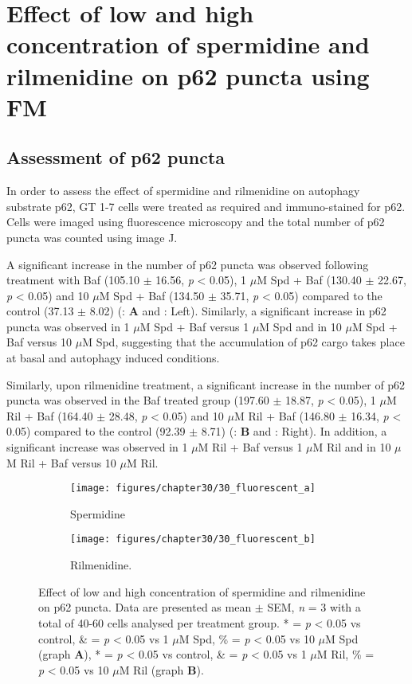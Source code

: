 {\section{Effect of low and high concentration of spermidine and rilmenidine on p62 puncta using FM}
\subsection{Assessment of p62 puncta}

In order to assess the effect of spermidine and rilmenidine on autophagy substrate p62, GT 1-7 cells were treated as required and immuno-stained for p62. Cells were imaged using fluorescence microscopy and the total number of p62 puncta was counted using image J. 

A significant increase in the number of p62 puncta was observed following treatment with Baf (105.10 $\pm$ 16.56, \textit{p} < 0.05), 1 $\mu$M Spd + Baf (130.40 $\pm$ 22.67, \textit{p} < 0.05) and 10 $\mu$M Spd + Baf (134.50 $\pm$ 35.71, \textit{p} < 0.05) compared to the control (37.13 $\pm$ 8.02) (: \textbf{A} and : Left). Similarly, a significant increase in p62 puncta was observed in 1 $\mu$M Spd + Baf versus 1 $\mu$M Spd and in 10 $\mu$M Spd + Baf versus 10 $\mu$M Spd, suggesting that the accumulation of p62 cargo takes place at basal and autophagy induced conditions. 

Similarly, upon rilmenidine treatment, a significant increase in the number of p62 puncta was observed in the Baf treated group (197.60 $\pm$ 18.87, \textit{p} < 0.05), 1 $\mu$M Ril + Baf (164.40 $\pm$ 28.48, \textit{p} < 0.05) and 10 $\mu$M Ril + Baf (146.80 $\pm$ 16.34, \textit{p} < 0.05) compared to the control (92.39 $\pm$ 8.71) (: \textbf{B} and : Right). In addition, a significant increase was observed in 1 $\mu$M Ril + Baf versus 1 $\mu$M Ril and in 10 $\mu$M Ril + Baf versus 10 $\mu$M Ril.

\begin{figure}[!htbp]
  \begin{subfigure}[b]{0.495\linewidth}
    \texttt{[image: figures/chapter30/30\_fluorescent\_a]}
    \caption{Spermidine}
  \end{subfigure}
  \begin{subfigure}[b]{0.495\linewidth}
    \texttt{[image: figures/chapter30/30\_fluorescent\_b]}
    \caption{Rilmenidine.}
  \end{subfigure}
    \caption[Effect of low and high concentration of spermidine and rilmenidine on p62 puncta]{Effect of low and high concentration of spermidine and rilmenidine on p62 puncta. Data are presented as mean $\pm$ SEM, \textit{n} = 3 with a total of 40-60 cells analysed per treatment group. * = \textit{p} < 0.05 vs control, \& = \textit{p} < 0.05 vs 1 $\mu$M Spd, \% = \textit{p} < 0.05 vs 10 $\mu$M Spd (graph \textbf{A}), * = \textit{p} < 0.05 vs control, \& = \textit{p} < 0.05 vs 1 $\mu$M Ril, \% = \textit{p} < 0.05 vs 10 $\mu$M Ril (graph \textbf{B}).}
  \label{fig:30_fluorescent_graph}
\end{figure}

}
